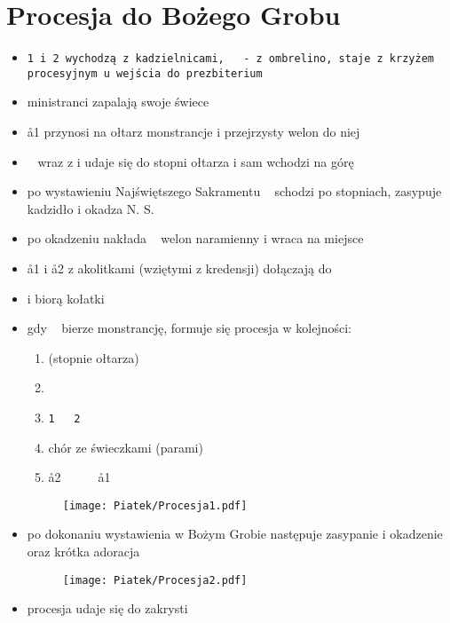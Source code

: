 \section{Procesja do Bożego Grobu}

	\begin{itemize}
	 \item \tt1 i \tt2 wychodzą z kadzielnicami, \oo~ - z ombrelino,  staje z krzyżem procesyjnym u wejścia do prezbiterium
	 \item ministranci zapalają swoje świece
	 \item \aa1 przynosi na ołtarz monstrancje i przejrzysty welon do niej
	 \item \ii~ wraz z  i  udaje się do stopni ołtarza i sam wchodzi na górę
	 \item po wystawieniu Najświętszego Sakramentu \ii~ schodzi po stopniach, zasypuje kadzidło i okadza N. S.
	 \item po okadzeniu  nakłada \ii~ welon naramienny i wraca na miejsce
	 \item \aa1 i \aa2 z akolitkami (wziętymi z kredensji) dołączają do 
	 \item {} i  biorą kołatki 
	 \item gdy \ii~ bierze monstrancję, formuje się procesja w kolejności:
	 
	  \begin{enumerate}\centering
	   \item[] (stopnie ołtarza)
	   \item[] ~~~\ii~~~~\oo~~~~
	   \item[] \tt1~~~\tt2
	   \item[] chór ze świeczkami (parami)
	   \item[] \aa2~~~~~~\aa1
	   \end{enumerate}
	  
	  \newpage
	  
	 \begin{figure}[h]
	 \centering
	    \texttt{[image: Piatek/Procesja1.pdf]}
	 \end{figure}
	 
	 \item po dokonaniu wystawienia w Bożym Grobie następuje zasypanie i okadzenie oraz krótka adoracja
	 
	 \begin{figure}[h]
	 \centering
	    \texttt{[image: Piatek/Procesja2.pdf]}
	 \end{figure}
	 
	 \item procesja udaje się do zakrysti
	\end{itemize}

